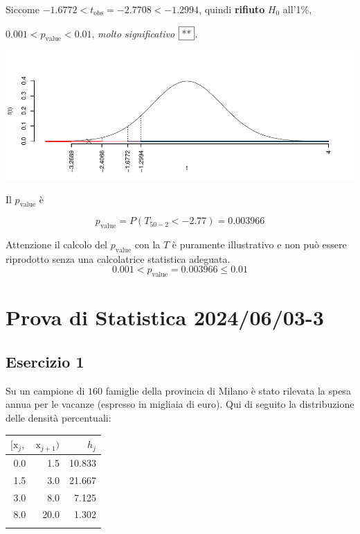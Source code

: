 \documentclass[
  11pt,
]{book}
\theoremstyle{mytheoremstyle}
\theoremstyle{mydefstyle}
\newenvironment{sol}
  {
  \begin{tcolorbox}[enhanced,breakable,arc=0.1mm,boxrule=1pt,colback=white,colframe=iblue,
  title=\bf \fontfamily{lmss}\selectfont \hspace{.5 cm} Soluzione,drop fuzzy shadow]

}{
\end{tcolorbox}
  }
\begin{document}
\begin{sol}
Siccome \(-1.6772<t_\text{obs}=-2.7708<-1.2994\), quindi \textbf{rifiuto} \(H_0\) all'1\%,

\(0.001<p_\text{value}<0.01\), \emph{molto significativo} \(\fbox{**}\).

\begin{center}\includegraphics{Esami_passati_con_soluzioni_files/figure-latex/2024-59-1} \end{center}

Il \(p_{\text{value}}\) è

\[ p_{\text{value}} = P(T_{50-2}<-2.77)=0.003966 \]

Attenzione il calcolo del \(p_\text{value}\) con la \(T\) è puramente illustrativo e non può essere riprodotto senza una calcolatrice statistica adeguata.\[
 0.001 < p_\text{value}= 0.003966 \leq 0.01 
\]

\end{sol}

\section{Prova di Statistica 2024/06/03-3}\label{prova-di-statistica-20240603-3}

\subsection{Esercizio 1}\label{esercizio-1-36}

Su un campione di \(160\) famiglie della provincia di Milano è stato rilevata la spesa annua per le vacanze (espresso in migliaia di euro). Qui di seguito la distribuzione delle densità percentuali:

\begin{table}[H]
\centering
\begin{tabular}{rrr}
\toprule
$[\text{x}_j,$ & $\text{x}_{j+1})$ & $h_j$\\
\midrule
0.0 & 1.5 & 10.833\\
1.5 & 3.0 & 21.667\\
3.0 & 8.0 & 7.125\\
8.0 & 20.0 & 1.302\\
 &  & \\
\bottomrule
\end{tabular}
\end{table}
\end{document}
